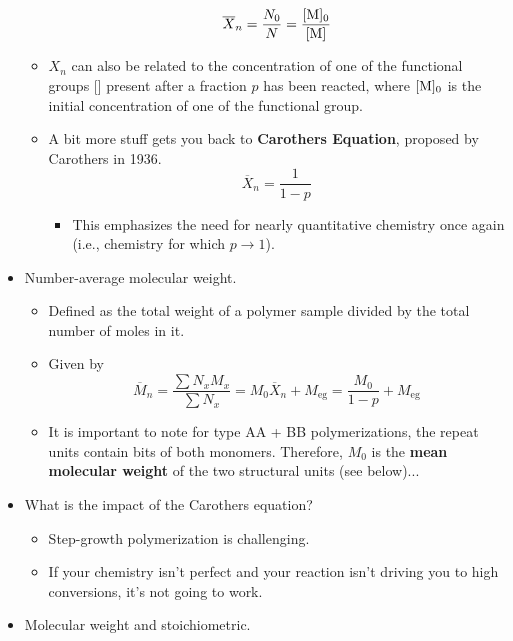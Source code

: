 \documentclass[../notes.tex]{subfiles}
\begin{document}
\begin{itemize}
\begin{itemize}
        \begin{equation*}
            \overline{X}_n = \frac{N_0}{N}
            = \frac{[\ce{M}]_0}{[\ce{M}]}
        \end{equation*}
        \item $X_n$ can also be related to the concentration of one of the functional groups [] present after a fraction $p$ has been reacted, where $[\ce{M}]_0$ is the initial concentration of one of the functional group.
        \item A bit more stuff gets you back to \textbf{Carothers Equation}, proposed by Carothers in 1936.
        \begin{equation*}
            \overline{X}_n = \frac{1}{1-p}
        \end{equation*}
        \begin{itemize}
            \item This emphasizes the need for nearly quantitative chemistry once again (i.e., chemistry for which $p\to 1$).
        \end{itemize}
    \end{itemize}
    \item Number-average molecular weight.
    \begin{itemize}
        \item Defined as the total weight of a polymer sample divided by the total number of moles in it.
        \item Given by
        \begin{equation*}
            \overline{M}_n = \frac{\sum N_xM_x}{\sum N_x}
            = M_0\overline{X}_n+M_\text{eg}
            = \frac{M_0}{1-p}+M_\text{eg}
        \end{equation*}
        \item It is important to note for type AA + BB polymerizations, the repeat units contain bits of both monomers. Therefore, $M_0$ is the \textbf{mean molecular weight} of the two structural units (see below)...
    \end{itemize}
    \item What is the impact of the Carothers equation?
    \begin{itemize}
        \item Step-growth polymerization is challenging.
        \item If your chemistry isn't perfect and your reaction isn't driving you to high conversions, it's not going to work.
    \end{itemize}
    \item Molecular weight and stoichiometric.

\end{itemize}
\end{document}
